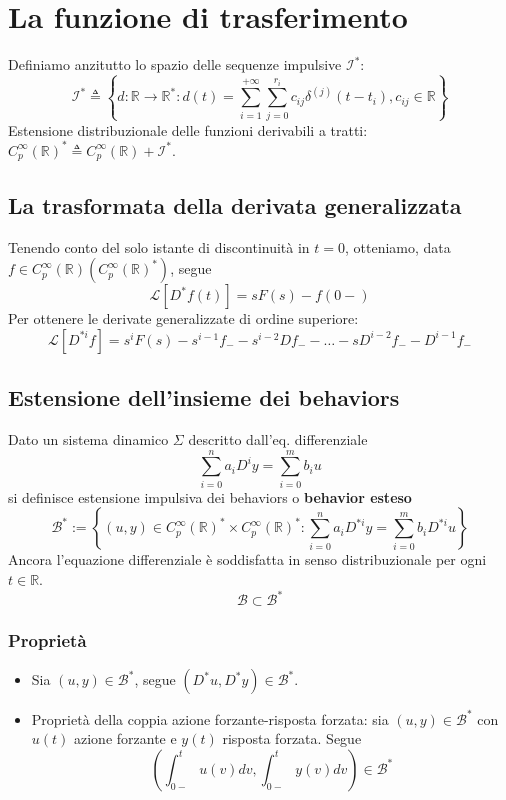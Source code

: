 \documentclass[11pt]{article}
\begin{document}
\section{La funzione di trasferimento}
Definiamo anzitutto lo spazio delle sequenze impulsive $\mathcal{I}^*$:
\begin{displaymath}
    \mathcal{I}^* \triangleq \left\{d:\mathbb{R}\rightarrow\mathbb{R}^*:d(t) = \sum_{i=1}^{+\infty}\sum_{j=0}^{r_i} c_{ij}\delta^{(j)}(t-t_i), c_{ij} \in \mathbb{R}\right\}
\end{displaymath}
Estensione distribuzionale delle funzioni derivabili a tratti: $C_p^\infty (\mathbb{R})^* \triangleq C_p^\infty (\mathbb{R}) + \mathcal{I}^*$.
\subsection{La trasformata della derivata generalizzata}
Tenendo conto del solo istante di discontinuità in $t=0$, otteniamo, data $f \in C_p^{\infty} (\mathbb{R})(C_p^\infty(\mathbb{R})^*)$, segue
\begin{displaymath}
    \mathcal{L}[D^*f(t)] = sF(s) - f(0-)
\end{displaymath}
Per ottenere le derivate generalizzate di ordine superiore:
\begin{displaymath}
    \mathcal{L}[D^{*i}f] = s^i F(s) - s^{i-1}f_- - s^{i-2} Df_- -\dots-sD^{i-2}f_--D^{i-1}f_-
\end{displaymath}
\subsection{Estensione dell'insieme dei behaviors}
Dato un sistema dinamico $\Sigma$ descritto dall'eq. differenziale
\begin{displaymath}
    \sum_{i=0}^n a_i D^i  y = \sum_{i=0}^m b_i u
\end{displaymath}
si definisce estensione impulsiva dei behaviors o \textbf{behavior esteso}
\begin{displaymath}
    \mathcal{B}^* := \left\{(u,y) \in C_p^\infty (\mathbb{R})^* \times C_p^\infty (\mathbb{R})^* : \sum_{i=0}^n a_i D^{*i} y = \sum_{i=0}^m b_i D^{*i} u\right\}
\end{displaymath}
Ancora l'equazione differenziale è soddisfatta in senso distribuzionale per ogni $t \in \mathbb{R}$.
\begin{displaymath}
    \mathcal{B} \subset \mathcal{B}^*
\end{displaymath}
\subsubsection{Proprietà}
\begin{itemize}
    \item Sia $(u,y)\in \mathcal{B}^*$, segue $(D^*u, D^*y)\in \mathcal{B}^*$.
    \item Proprietà della coppia azione forzante-risposta forzata: sia $(u,y) \in \mathcal{B}^*$ con $u(t)$ azione forzante e $y(t)$ risposta forzata. Segue
          \begin{displaymath}
              \left(\int_{0-}^t u(v) dv,\int_{0-}^t y(v) dv\right) \in \mathcal{B}^*
          \end{displaymath}
\end{itemize}
\end{document}
